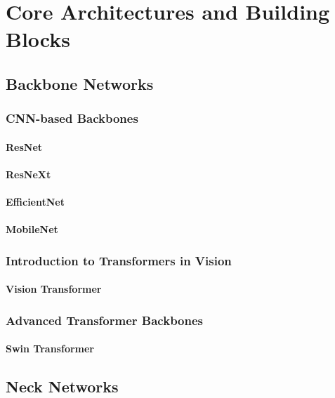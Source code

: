 \part{Core Architectures and Building Blocks}

\chapter{Backbone Networks}
\section{CNN-based Backbones}
\subsection{ResNet}
\subsection{ResNeXt}
\subsection{EfficientNet}
\subsection{MobileNet}

\section{Introduction to Transformers in Vision}
\subsection{Vision Transformer}

\section{Advanced Transformer Backbones}
\subsection{Swin Transformer}

\chapter{Neck Networks}
